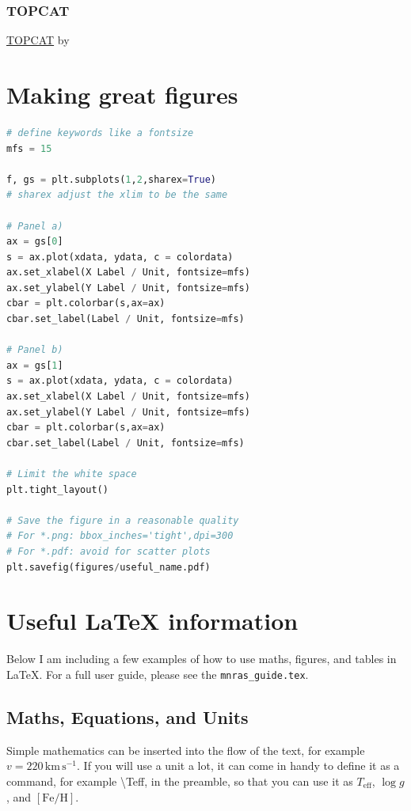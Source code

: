 \documentclass[fleqn,usenatbib]{mnras}
\newcommand{\Teff}{$T_\mathrm{eff}$\xspace}
\newcommand{\logg}{$\log g$\xspace}
\newcommand{\feh}{$\mathrm{[Fe/H]}$\xspace}
\begin{document}
\subsubsection{TOPCAT}

\href{https://www.star.bris.ac.uk/~mbt/topcat/}{\textsc{TOPCAT}} by 



\section{Making great figures} \label{sec:figures}

\begin{lstlisting}[language=Python, caption=How to create a figure with 2 panels]
# define keywords like a fontsize
mfs = 15

f, gs = plt.subplots(1,2,sharex=True)
# sharex adjust the xlim to be the same

# Panel a)
ax = gs[0]
s = ax.plot(xdata, ydata, c = colordata)
ax.set_xlabel(X Label / Unit, fontsize=mfs)
ax.set_ylabel(Y Label / Unit, fontsize=mfs)
cbar = plt.colorbar(s,ax=ax)
cbar.set_label(Label / Unit, fontsize=mfs)

# Panel b)
ax = gs[1]
s = ax.plot(xdata, ydata, c = colordata)
ax.set_xlabel(X Label / Unit, fontsize=mfs)
ax.set_ylabel(Y Label / Unit, fontsize=mfs)
cbar = plt.colorbar(s,ax=ax)
cbar.set_label(Label / Unit, fontsize=mfs)

# Limit the white space
plt.tight_layout()

# Save the figure in a reasonable quality
# For *.png: bbox_inches='tight',dpi=300
# For *.pdf: avoid for scatter plots
plt.savefig(figures/useful_name.pdf)
\end{lstlisting}


\section{Useful LaTeX information} \label{sec:latex_information}

Below I am including a few examples of how to use maths, figures, and tables in \LaTeX. For a full user guide, please see the \texttt{mnras\_guide.tex}.

\subsection{Maths, Equations, and Units}
\label{sec:maths} %

Simple mathematics can be inserted into the flow of the text, for example $v=220\,\mathrm{km\,s^{-1}}$. If you will use a unit a lot, it can come in handy to define it as a command, for example \textbackslash Teff, in the preamble, so that you can use it as \Teff, \logg, and \feh.
\end{document}
